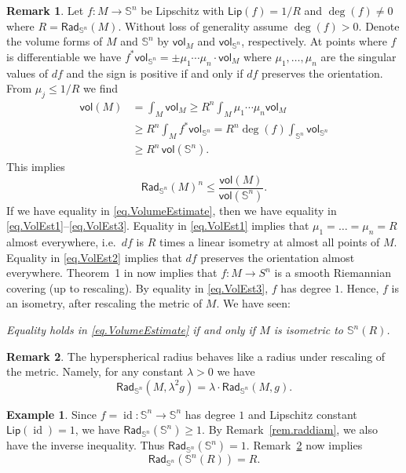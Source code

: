 \documentclass[11pt,reqno]{amsart}
\newcommand{\RadSn}{\mathsf{Rad}_{\Sn}}
\newcommand{\Lip}{\mathsf{Lip}}
\newcommand{\Sn}{\mathbb{S}^n}
\newcommand{\<}{\langle}
\renewcommand{\>}{\rangle}
\newcommand{\vol}{\mathsf{vol}}
\DeclareMathOperator{\id}{\mathrm{id}}
\theoremstyle{definition}
\newtheorem{remark}{Remark}
\newtheorem{example}{Example}
\begin{document}
\begin{remark}
Let $f\colon M\to\Sn$ be Lipschitz with $\Lip(f)=1/R$ and $\deg(f)\neq0$ where $R=\RadSn(M)$.
Without loss of generality assume $\deg(f)>0$.
Denote the volume forms of $M$ and $\Sn$ by $\vol_{M}$ and $\vol_{\Sn}$, respectively.
At points where $f$ is differentiable we have $f^*\vol_{\Sn} = \pm \mu_1\cdots \mu_n\cdot \vol_{M}$ where $\mu_1,\dots,\mu_n$ are the singular values of $df$ and the sign is positive if and only if $df$ preserves the orientation.
From $\mu_j\le 1/R$ we find
\begin{align}
\vol(M) 
&=
\int_M \vol_M \ge
R^n \int_M \mu_1\cdots\mu_n \vol_M \label{eq.VolEst1}\\
&\ge 
R^n \int_M f^*\vol_{\Sn} 
= 
R^n \deg(f) \int_{\Sn} \vol_{\Sn} \label{eq.VolEst2}\\
&\ge 
R^n\, \vol(\Sn).\label{eq.VolEst3}
\end{align}
This implies
\begin{equation}
\RadSn(M)^n \le \frac{\vol(M)}{\vol(\Sn)}.
\label{eq.VolumeEstimate}
\end{equation}
If we have equality in \eqref{eq.VolumeEstimate}, then we have equality in \eqref{eq.VolEst1}--\eqref{eq.VolEst3}.
Equality in \eqref{eq.VolEst1} implies that $\mu_1=\dots=\mu_n=R$ almost everywhere, i.e.\ $df$ is $R$ times a linear isometry at almost all points of $M$.
Equality in \eqref{eq.VolEst2} implies that $df$ preserves the orientation almost everywhere. 
Theorem~1 in \cite{KMS} now implies that $f\colon M\to S^n$ is a smooth Riemannian covering (up to rescaling).
By equality in \eqref{eq.VolEst3}, $f$ has degree $1$.
Hence, $f$ is an isometry, after rescaling the metric of $M$.
We have seen:

\emph{Equality holds in \eqref{eq.VolumeEstimate} if and only if $M$ is isometric to $\Sn(R)$.}

\end{remark}

\begin{remark}\label{rem.rescaleRad}
The hyperspherical radius behaves like a radius under rescaling of the metric.
Namely, for any constant $\lambda>0$ we have
$$
\RadSn(M,\lambda^2g) = \lambda\cdot\RadSn(M,g).
$$
\end{remark}

\begin{example}
Since $f=\id\colon \Sn\to \Sn$ has degree $1$ and Lipschitz constant $\Lip(\id)=1$, we have $\RadSn(\Sn)\ge1$.
By Remark~\ref{rem.raddiam}, we also have the inverse inequality.
Thus $\RadSn(\Sn)=1$.
Remark~\ref{rem.rescaleRad} now implies
$$
\RadSn(\Sn(R)) = R.
$$
\end{example}
\end{document}
